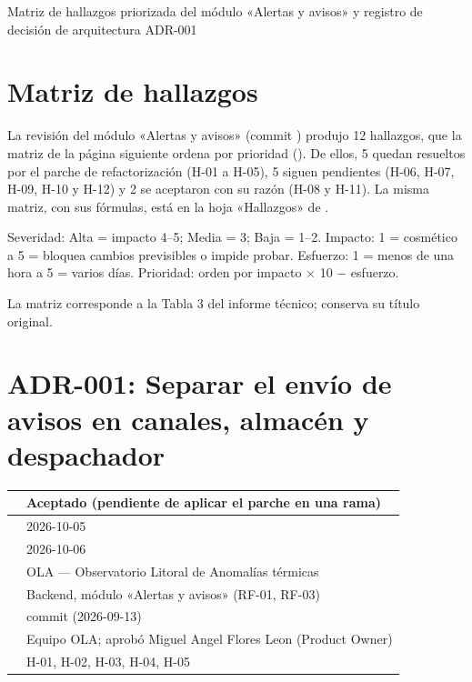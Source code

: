 \documentclass[11pt,a4paper]{article}
\begin{document}
        {Matriz de hallazgos priorizada del módulo «Alertas y avisos» y registro de decisión de arquitectura ADR-001}

{\hypersetup{linkcolor=black}\renewcommand{\contentsname}{\sffamily\color{azul}Índice}\tableofcontents}
\thispagestyle{plain}
\newpage

\section{Matriz de hallazgos}

La revisión del módulo «Alertas y avisos» (commit ) produjo 12 hallazgos, que la matriz de la página siguiente ordena por prioridad (). De ellos, 5 quedan resueltos por el parche de refactorización (H-01 a H-05), 5 siguen pendientes (H-06, H-07, H-09, H-10 y H-12) y 2 se aceptaron con su razón (H-08 y H-11). La misma matriz, con sus fórmulas, está en la hoja «Hallazgos» de .

 Severidad: Alta = impacto 4--5; Media = 3; Baja = 1--2. Impacto: 1 = cosmético a 5 = bloquea cambios previsibles o impide probar. Esfuerzo: 1 = menos de una hora a 5 = varios días. Prioridad: orden por impacto $\times$ 10 $-$ esfuerzo.

 La matriz corresponde a la Tabla 3 del informe técnico; conserva su título original.


\clearpage
\section{ADR-001: Separar el envío de avisos en canales, almacén y despachador}

\begin{center}
\small
{}
\begin{tabularx}{\textwidth}{L{4.2cm}Y}
\hline
{} & Aceptado (pendiente de aplicar el parche en una rama)\\ \hline
{} & 2026-10-05\\ \hline
{} & 2026-10-06\\ \hline
{} & OLA — Observatorio Litoral de Anomalías térmicas\\ \hline
{} & Backend, módulo «Alertas y avisos» (RF-01, RF-03)\\ \hline
{} & commit  (2026-09-13)\\ \hline
{} & Equipo OLA; aprobó Miguel Angel Flores Leon (Product Owner)\\ \hline
{} & H-01, H-02, H-03, H-04, H-05\\ \hline
\end{tabularx}
\end{center}
\end{document}
